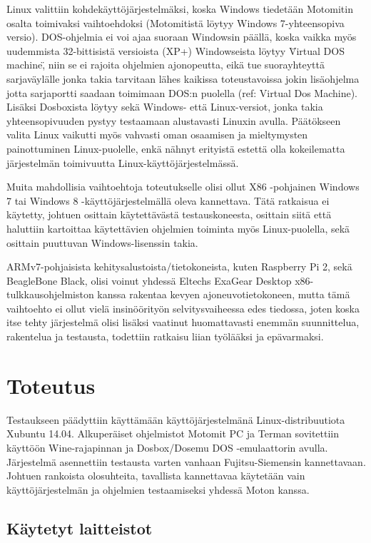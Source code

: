 \documentclass[11pt,a4paper,oneside,article]{memoir}
\begin{document}
Linux valittiin kohdekäyttöjärjestelmäksi, koska Windows tiedetään Motomitin osalta toimivaksi vaihtoehdoksi (Motomitistä löytyy Windows 7-yhteensopiva versio). DOS-ohjelmia ei voi ajaa suoraan Windowsin päällä, koska vaikka myös uudemmista 32-bittisistä versioista (XP+) Windowseista löytyy \"Virtual DOS machine\", niin se ei rajoita ohjelmien ajonopeutta, eikä tue suorayhteyttä sarjaväylälle jonka takia tarvitaan lähes kaikissa toteustavoissa jokin lisäohjelma jotta sarjaportti saadaan toimimaan DOS:n puolella (ref: Virtual Dos Machine). Lisäksi Dosboxista löytyy sekä Windows- että Linux-versiot, jonka takia yhteensopivuuden pystyy testaamaan alustavasti Linuxin avulla. Päätökseen valita Linux vaikutti myös vahvasti oman osaamisen ja mieltymysten painottuminen Linux-puolelle, enkä nähnyt erityistä estettä olla kokeilematta järjestelmän toimivuutta Linux-käyttöjärjestelmässä.

Muita mahdollisia vaihtoehtoja toteutukselle olisi ollut X86 -pohjainen Windows 7 tai Windows 8 -käyttöjärjestelmällä oleva kannettava. Tätä ratkaisua ei käytetty, johtuen osittain käytettävästä testauskoneesta, osittain siitä että haluttiin kartoittaa käytettävien ohjelmien toiminta myös Linux-puolella, sekä osittain puuttuvan Windows-lisenssin takia.

ARMv7-pohjaisista kehitysalustoista/tietokoneista, kuten Raspberry Pi 2, sekä BeagleBone Black, olisi voinut yhdessä Eltechs ExaGear Desktop x86-tulkkausohjelmiston kanssa rakentaa kevyen ajoneuvotietokoneen, mutta tämä vaihtoehto ei ollut vielä insinöörityön selvitysvaiheessa edes tiedossa, joten koska itse tehty järjestelmä olisi lisäksi vaatinut huomattavasti enemmän suunnittelua, rakentelua ja testausta, todettiin ratkaisu liian työlääksi ja epävarmaksi.

\chapter{Toteutus}

Testaukseen päädyttiin käyttämään käyttöjärjestelmänä Linux-distribuutiota Xubuntu 14.04. Alkuperäiset ohjelmistot Motomit PC ja Terman sovitettiin käyttöön Wine-rajapinnan ja Dosbox/Dosemu DOS -emulaattorin avulla. Järjestelmä asennettiin testausta varten vanhaan Fujitsu-Siemensin kannettavaan. Johtuen rankoista olosuhteita, tavallista kannettavaa käytetään vain käyttöjärjestelmän ja ohjelmien testaamiseksi yhdessä Moton kanssa.

\section{Käytetyt laitteistot}
\end{document}
